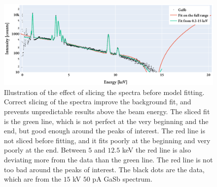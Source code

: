 \begin{figure}[htbp]
    \centering
    \includegraphics[width=0.95\linewidth]{figures/discussion/model_slicing_fit.pdf}
    \caption{
        Illustration of the effect of slicing the spectra before model fitting.
        Correct slicing of the spectra improve the background fit, and prevents unpredictable results above the beam energy.
        The sliced fit is the green line, which is not perfect at the very beginning and the end, but good enough around the peaks of interest.
        The red line is not sliced before fitting, and it fits poorly at the beginning and very poorly at the end.
        Between $5$ and $12.5$ keV the red line is also deviating more from the data than the green line.
        The red line is not too bad around the peaks of interest.
        The black dots are the data, which are from the $15$ kV $50$ pA GaSb spectrum.
    }
    \label{fig:discussion:model_slicing_fit}
\end{figure}



